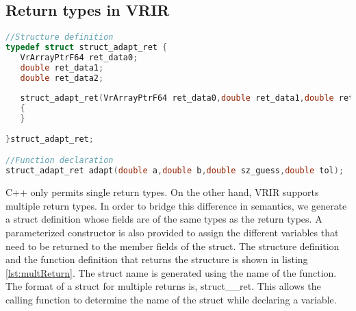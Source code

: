 \subsection{Return types in VRIR}
\begin{lstlisting}[language=c,caption={Generated structure to handle multiple returns.},label={lst:multReturn}]
//Structure definition
typedef struct struct_adapt_ret { 
   VrArrayPtrF64 ret_data0;
   double ret_data1;
   double ret_data2;
   
   struct_adapt_ret(VrArrayPtrF64 ret_data0,double ret_data1,double ret_data2) :ret_data0(ret_data0),ret_data1(ret_data1),ret_data2(ret_data2)
   {
   }
   
}struct_adapt_ret;

//Function declaration
struct_adapt_ret adapt(double a,double b,double sz_guess,double tol);
\end{lstlisting}
C++ only permits single return types. On the other hand, VRIR supports multiple return types. In order to bridge this difference in semantics, we generate a struct definition whose fields are of the same types as the return types. A parameterized constructor is also provided to assign the different variables that need to be returned to the member fields of the struct. The structure definition and the function definition that returns the structure is shown in listing \ref{lst:multReturn}. The struct name is generated using the name of the function. The format of a struct for multiple returns is, struct\_<function name>\_ret. This allows the calling function to determine the name of the struct while declaring a variable. 
